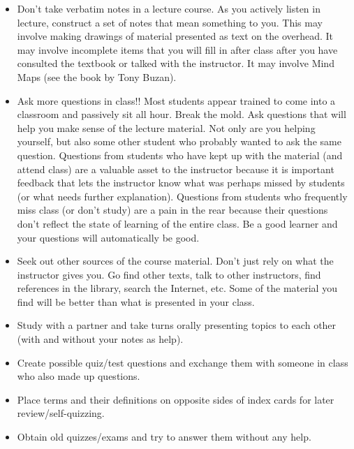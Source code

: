 \begin{itemize}
	\item Don't take verbatim notes in a lecture course. As you actively listen in lecture, construct a set of notes that mean something to you. This may involve making drawings of material presented as text on the overhead. It may involve incomplete items that you will fill in after class after you have consulted the textbook or talked with the instructor. It may involve Mind Maps (see the book by Tony Buzan).
	
	\item Ask more questions in class!! Most students appear trained to come into a classroom and passively sit all hour. Break the mold. Ask questions that will help you make sense of the lecture material. Not only are you helping yourself, but also some other student who probably wanted to ask the same question. Questions from students who have kept up with the material (and attend class) are a valuable asset to the instructor because it is important feedback that lets the instructor know what was perhaps missed by students (or what needs further explanation). Questions from students who frequently miss class (or don't study) are a pain in the rear because their questions don't reflect the state of learning of the entire class. Be a good learner and your questions will automatically be good.
	
	\item Seek out other sources of the course material. Don't just rely on what the instructor gives you. Go find other texts, talk to other instructors, find references in the library, search the Internet, etc. Some of the material you find will be better than what is presented in your class.
	
	\item Study with a partner and take turns orally presenting topics to each other (with and without your notes as help).
	
	\item Create possible quiz/test questions and exchange them with someone in class who also made up questions.
	
	\item Place terms and their definitions on opposite sides of index cards for later review/self-quizzing.
	
	\item Obtain old quizzes/exams and try to answer them without any help.
\end{itemize}
